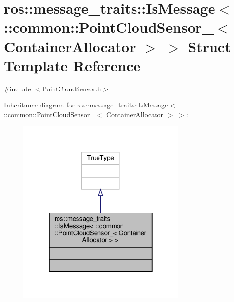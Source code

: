 \hypertarget{structros_1_1message__traits_1_1IsMessage_3_01_1_1common_1_1PointCloudSensor___3_01ContainerAllocator_01_4_01_4}{}\section{ros\+:\+:message\+\_\+traits\+:\+:Is\+Message$<$ \+:\+:common\+:\+:Point\+Cloud\+Sensor\+\_\+$<$ Container\+Allocator $>$ $>$ Struct Template Reference}
\label{structros_1_1message__traits_1_1IsMessage_3_01_1_1common_1_1PointCloudSensor___3_01ContainerAllocator_01_4_01_4}


{\ttfamily \#include $<$Point\+Cloud\+Sensor.\+h$>$}



Inheritance diagram for ros\+:\+:message\+\_\+traits\+:\+:Is\+Message$<$ \+:\+:common\+:\+:Point\+Cloud\+Sensor\+\_\+$<$ Container\+Allocator $>$ $>$\+:\nopagebreak
\begin{figure}[H]
\begin{center}
\leavevmode
\includegraphics[width=238pt]{d7/def/structros_1_1message__traits_1_1IsMessage_3_01_1_1common_1_1PointCloudSensor___3_01ContainerAllocator_01_4_01_4__inherit__graph}
\end{center}
\end{figure}


